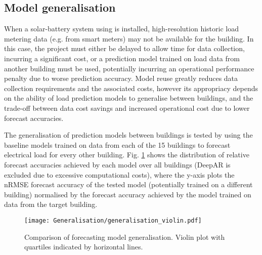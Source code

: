 \subsection{Model generalisation} \label{sec:forecasting-generalisation}


When a solar-battery system using  is installed, high-resolution historic load metering data (e.g. from smart meters) may not be available for the building. In this case, the project must either be delayed to allow time for data collection, incurring a significant cost, or a prediction model trained on load data from another building must be used, potentially incurring an operational performance penalty due to worse prediction accuracy. Model reuse greatly reduces data collection requirements and the associated costs, however its appropriacy depends on the ability of load prediction models to generalise between buildings, and the trade-off between data cost savings and increased operational cost due to lower forecast accuracies.

The generalisation of prediction models between buildings is tested by using the baseline models trained on data from each of the 15 buildings to forecast electrical load for every other building. Fig. \ref{fig:forecasting-generalisation-violin} shows the distribution of relative forecast accuracies achieved by each model over all buildings (DeepAR is excluded due to excessive computational costs), where the y-axis plots the nRMSE forecast accuracy of the tested model (potentially trained on a different building) normalised by the forecast accuracy achieved by the model trained on data from the target building.\\

\begin{figure}[h]
    \centering
    \texttt{[image: Generalisation/generalisation\_violin.pdf]}
    \vspace*{-0.5cm}
    \caption{Comparison of forecasting model generalisation. Violin plot with quartiles indicated by horizontal lines.}
    \label{fig:forecasting-generalisation-violin}
\end{figure}
\bigskip

